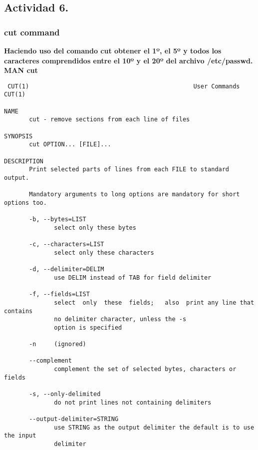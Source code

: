\documentclass[a4paper,11pt,spanish]{article} %
\newenvironment{myscriptlisting}
{\begin{list}{}{\setlength{\leftmargin}{1em}}\item\scriptsize\bfseries}
{\end{list}}
\begin{document}
\cite{thegeekstuff}

\subsection{Actividad 6.}

\subsubsection{cut command }

\textbf{Haciendo uso del comando cut obtener el 1º, el 5º y todos los caracteres
comprendidos entre el 10º y el 20º del archivo /etc/passwd.}\\

\textbf{MAN cut}

\begin{myscriptlisting}
 \begin{verbatim}
 CUT(1)                                              User Commands                                              CUT(1)

NAME
       cut - remove sections from each line of files

SYNOPSIS
       cut OPTION... [FILE]...

DESCRIPTION
       Print selected parts of lines from each FILE to standard output.

       Mandatory arguments to long options are mandatory for short options too.

       -b, --bytes=LIST
              select only these bytes

       -c, --characters=LIST
              select only these characters

       -d, --delimiter=DELIM
              use DELIM instead of TAB for field delimiter

       -f, --fields=LIST
              select  only  these  fields;   also  print any line that contains
              no delimiter character, unless the -s
              option is specified

       -n     (ignored)

       --complement
              complement the set of selected bytes, characters or fields

       -s, --only-delimited
              do not print lines not containing delimiters

       --output-delimiter=STRING
              use STRING as the output delimiter the default is to use the input
              delimiter
 \end{verbatim}
\end{myscriptlisting}
\end{document}
